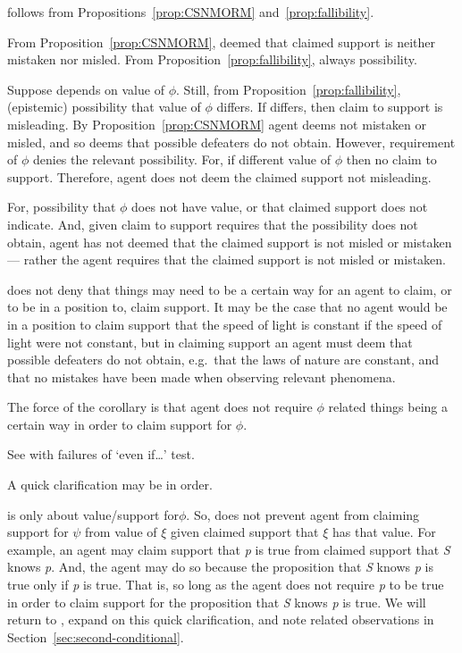 \begin{note}[\eiS{}]
  \eiS{} follows from Propositions~\ref{prop:CSNMORM} and~\ref{prop:fallibility}.

  From Proposition~\ref{prop:CSNMORM}, deemed that claimed support is neither mistaken nor misled.
  From Proposition~\ref{prop:fallibility}, always possibility.

  Suppose depends on value of \(\phi\).
  Still, from Proposition~\ref{prop:fallibility}, (epistemic) possibility that value of \(\phi\) differs.
  If differs, then claim to support is misleading.
  By Proposition~\ref{prop:CSNMORM} agent deems not mistaken or misled, and so deems that possible defeaters do not obtain.
  However, requirement of \(\phi\) denies the relevant possibility.
  For, if different value of \(\phi\) then no claim to support.
  Therefore, agent does not deem the claimed support not misleading.


  For, possibility that \(\phi\) does not have value, or that claimed support does not indicate.
  And, given claim to support requires that the possibility does not obtain, agent has not deemed that the claimed support is not misled or mistaken --- rather the agent requires that the claimed support is not misled or mistaken.

  \eiS{} does not deny that things may need to be a certain way for an agent to claim, or to be in a position to, claim support.
  It may be the case that no agent would be in a position to claim support that the speed of light is constant if the speed of light were not constant, but in claiming support an agent must deem that possible defeaters do not obtain, e.g.\ that the laws of nature are constant, and that no mistakes have been made when observing relevant phenomena.

  The force of the corollary is that agent does not require \(\phi\) related things being a certain way in order to claim support for \(\phi\).

  See with failures of `even if\dots' test.
\end{note}

\begin{note}
  A quick clarification may be in order.

  \eiS{} is only about value/support for\(\phi\).
  So, \eiS{} does not prevent agent from claiming support for \(\psi\) from value of \(\xi\) given claimed support that \(\xi\) has that value.
  For example, an agent may claim support that \emph{p} is true from claimed support that \emph{S} knows \emph{p}.
  And, the agent may do so because the proposition that \emph{S} knows \emph{p} is true only if \emph{p} is true.
  That is, so long as the agent does not require \emph{p} to be true in order to claim support for the proposition that \emph{S} knows \emph{p} is true.
  We will return to \eiS{}, expand on this quick clarification, and note related observations in Section~\ref{sec:second-conditional}.
\end{note}


